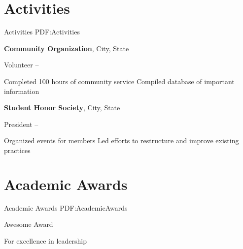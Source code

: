 \documentclass[letterpaper,9pt,oneside]{article}
\begin{document}
\begin{body}



\section
{Activities}
{Activities}
{PDF:Activities}

\textbf{Community Organization}, City, State
\par
Volunteer
\hfill
{} --
\begin{detail}
\SmallEntryGap
\BulletItem
Completed 100 hours of community service
\BulletItem
Compiled database of important information
\end{detail}

\EntryGap
\textbf{Student Honor Society}, City, State
\par
President
\hfill
{} --
\begin{detail}
\SmallEntryGap
\BulletItem
Organized events for members
\BulletItem
Led efforts to restructure and improve existing practices
\end{detail}



\section
{Academic Awards}
{Academic Awards}
{PDF:AcademicAwards}

Awesome Award
\hfill
{}
\begin{detail}
For excellence in leadership
\end{detail}


\end{body}
\end{document}

